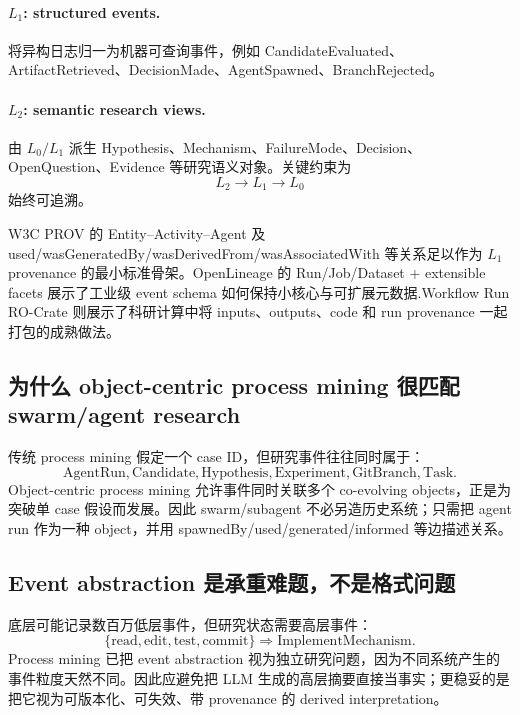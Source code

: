 \documentclass[11pt,a4paper]{ctexart}
\begin{document}
\paragraph{$L_1$: structured events.}
将异构日志归一为机器可查询事件，例如 CandidateEvaluated、ArtifactRetrieved、DecisionMade、AgentSpawned、BranchRejected。

\paragraph{$L_2$: semantic research views.}
由 $L_0/L_1$ 派生 Hypothesis、Mechanism、FailureMode、Decision、OpenQuestion、Evidence 等研究语义对象。关键约束为
\begin{equation}
 L_2\to L_1\to L_0
\end{equation}
始终可追溯。

W3C PROV 的 Entity--Activity--Agent 及 used/wasGeneratedBy/wasDerivedFrom/wasAssociatedWith 等关系足以作为 $L_1$ provenance 的最小标准骨架\parencite{w3cprov2013}。OpenLineage 的 Run/Job/Dataset + extensible facets 展示了工业级 event schema 如何保持小核心与可扩展元数据\parencite{openlineage}.Workflow Run RO-Crate 则展示了科研计算中将 inputs、outputs、code 和 run provenance 一起打包的成熟做法\parencite{leo2024wfrun}。

\subsection{为什么 object-centric process mining 很匹配 swarm/agent research}

传统 process mining 假定一个 case ID，但研究事件往往同时属于：
\begin{equation}
 \text{AgentRun},\text{Candidate},\text{Hypothesis},\text{Experiment},\text{GitBranch},\text{Task}.
\end{equation}
Object-centric process mining 允许事件同时关联多个 co-evolving objects，正是为突破单 case 假设而发展\parencite{berti2023ocpm,vanderAalst2026ocpm}。因此 swarm/subagent 不必另造历史系统；只需把 agent run 作为一种 object，并用 spawnedBy/used/generated/informed 等边描述关系。

\subsection{Event abstraction 是承重难题，不是格式问题}

底层可能记录数百万低层事件，但研究状态需要高层事件：
\begin{equation}
 \{\text{read},\text{edit},\text{test},\text{commit}\}\Rightarrow\text{ImplementMechanism}.
\end{equation}
Process mining 已把 event abstraction 视为独立研究问题，因为不同系统产生的事件粒度天然不同\parencite{diba2021eventabstraction}。因此应避免把 LLM 生成的高层摘要直接当事实；更稳妥的是把它视为可版本化、可失效、带 provenance 的 derived interpretation。
\end{document}
